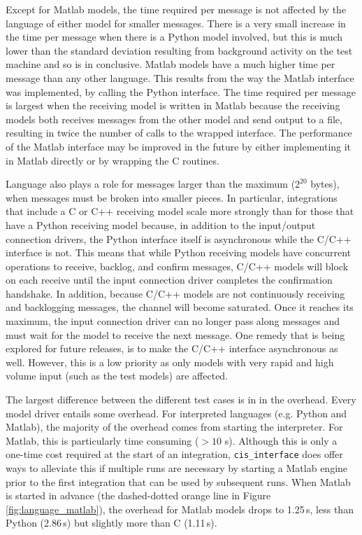 \documentclass[journal]{IEEEtran}
\newcommand{\cis}{{\tt cis\_interface}{}}
\begin{document}
Except for Matlab models, the time required per message is not affected by the language of either model for smaller messages. There is a very small increase in the time per message when there is a Python model involved, but this is much lower than the standard deviation resulting from background activity on the test machine and so is in conclusive. Matlab models have a much higher time per message than any other language. This results from the way the Matlab interface was implemented, by calling the Python interface. The time required per message is largest when the receiving model is written in Matlab because the receiving models both receives messages from the other model and send output to a file, resulting in twice the number of calls to the wrapped interface. The performance of the Matlab interface may be improved in the future by either implementing it in Matlab directly or by wrapping the C routines.

Language also plays a role for messages larger than the maximum ($2^{20}$ bytes), when messages must be broken into smaller pieces. In particular, integrations that include a C or C++ receiving model scale more strongly than for those that have a Python receiving model because, in addition to the input/output connection drivers, the Python interface itself is asynchronous while the C/C++ interface is not. This means that while Python receiving models have concurrent operations to receive, backlog, and confirm messages, C/C++ models will block on each receive until the input connection driver completes the confirmation handshake. In addition, because C/C++ models are not continuously receiving and backlogging messages, the channel will become saturated. Once it reaches its maximum, the input connection driver can no longer pass along messages and must wait for the model to receive the next message. One remedy that is being explored for future releases, is to make the C/C++ interface asynchronous as well. However, this is a low priority as only models with very rapid and high volume input (such as the test models) are affected.

The largest difference between the different test cases is in in the overhead. Every model driver entails some overhead. For interpreted languages (e.g. Python and Matlab), the majority of the overhead comes from starting the interpreter. For Matlab, this is particularly time consuming ($>10$ s). Although this is only a one-time cost required at the start of an integration, {\cis} does offer ways to alleviate this if multiple runs are necessary by starting a Matlab engine prior to the first integration that can be used by subsequent runs. When Matlab is started in advance (the dashed-dotted orange line in Figure \ref{fig:language_matlab}), the overhead for Matlab models drops to 1.25\,s, less than Python (2.86\,s) but slightly more than C (1.11\,s).
\end{document}
